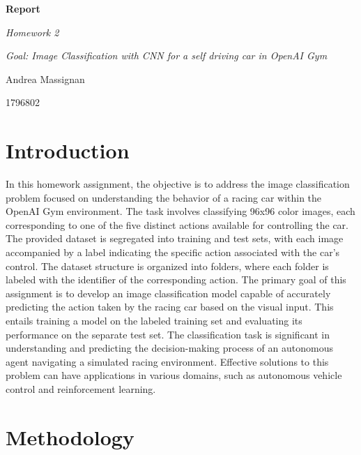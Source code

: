 \documentclass{article}
\begin{document}
\begin{titlepage}
    \centering
    \vspace*{2cm}
    {\Huge\bfseries Report\par}
    \vspace{2cm}
    {\Large\itshape Homework 2\par}
    \vspace{0.5cm}
    {\large\itshape Goal: Image Classification with CNN for a self driving car in OpenAI Gym\par}
    \vfill
    {\Large Andrea Massignan\par}
    {\Large 1796802\par}
    \vfill
\end{titlepage}

\section{Introduction}

In this homework assignment, the objective is to address the image classification problem focused on understanding the behavior of a racing car within the OpenAI Gym environment. The task involves classifying 96x96 color images, each corresponding to one of the five distinct actions available for controlling the car.
\newline
\newline
The provided dataset is segregated into training and test sets, with each image accompanied by a label indicating the specific action associated with the car's control. The dataset structure is organized into folders, where each folder is labeled with the identifier of the corresponding action.
\newline
\newline
The primary goal of this assignment is to develop an image classification model capable of accurately predicting the action taken by the racing car based on the visual input. This entails training a model on the labeled training set and evaluating its performance on the separate test set.
\newline
\newline
The classification task is significant in understanding and predicting the decision-making process of an autonomous agent navigating a simulated racing environment. Effective solutions to this problem can have applications in various domains, such as autonomous vehicle control and reinforcement learning.

\section{Methodology}
\end{document}
